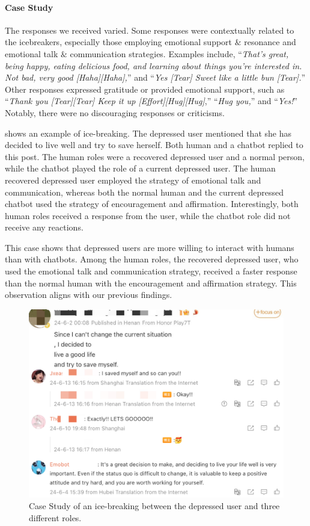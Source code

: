 \paragraph{Case Study}

The responses we received varied. Some responses were contextually related to the icebreakers, especially those employing emotional support \( \mbox{\&} \) resonance and emotional talk \( \mbox{\&} \) communication strategies. Examples include, ``\textit{That's great, being happy, eating delicious food, and learning about things you're interested in. Not bad, very good [Haha][Haha],}'' and ``\textit{Yes [Tear] Sweet like a little bun [Tear].}'' Other responses expressed gratitude or provided emotional support, such as ``\textit{Thank you [Tear][Tear] Keep it up [Effort][Hug][Hug]},'' ``\textit{Hug you,}'' and ``\textit{Yes!}'' Notably, there were no discouraging responses or criticisms.

 shows an example of ice-breaking. The depressed user mentioned that she has decided to live well and try to save herself. Both human and a chatbot replied to this post. The human roles were a recovered depressed user and a normal person, while the chatbot played the role of a current depressed user. The human recovered depressed user employed the strategy of emotional talk and communication, whereas both the normal human and the current depressed chatbot used the strategy of encouragement and affirmation. Interestingly, both human roles received a response from the user, while the chatbot role did not receive any reactions.

This case shows that depressed users are more willing to interact with humans than with chatbots. Among the human roles, the recovered depressed user, who used the emotional talk and communication strategy, received a faster response than the normal human with the encouragement and affirmation strategy. This observation aligns with our previous findings.

\begin{figure}[th]
    \centering
    \includegraphics[width=1\columnwidth]{images/case.jpeg}
    \caption{Case Study of an ice-breaking between the depressed user and three different roles.}
    \label{fig:case1}
\end{figure}

